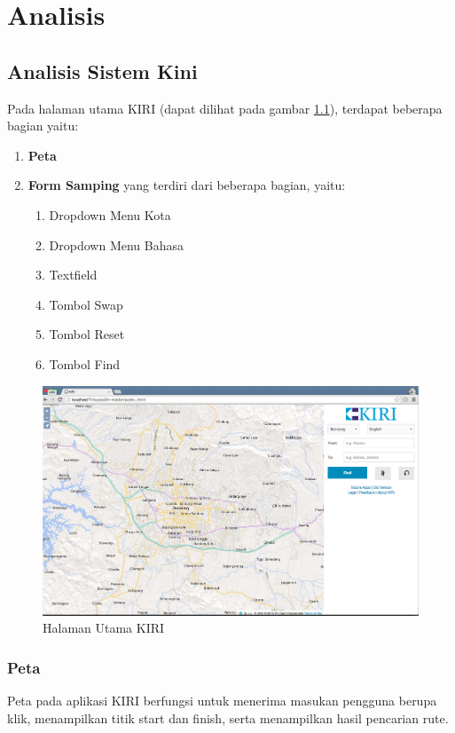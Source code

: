 \chapter{Analisis}
\label{chap:analisis}

\section{Analisis Sistem Kini}
\label{sec:analisiskini}
Pada halaman utama KIRI (dapat dilihat pada gambar \ref{fig:3_KIRI_main}), terdapat beberapa bagian yaitu:

\begin{enumerate}
    		\item \textbf{Peta}
    		\item \textbf{Form Samping} yang terdiri dari beberapa bagian, yaitu:
    		\begin{enumerate}
    			\item Dropdown Menu Kota
    			\item Dropdown Menu Bahasa
    			\item Textfield
    			\item Tombol Swap
    			\item Tombol Reset
    			\item Tombol Find
    		\end{enumerate}
\end{enumerate}

\begin{figure}[H]
	\centering
	\includegraphics[scale=0.3]{Gambar/KIRI-main}
	\caption{Halaman Utama KIRI} 
	\label{fig:3_KIRI_main}
\end{figure}

\subsection{Peta}
Peta pada aplikasi KIRI berfungsi untuk menerima masukan pengguna berupa klik,  menampilkan titik start dan finish, serta menampilkan hasil pencarian rute.

